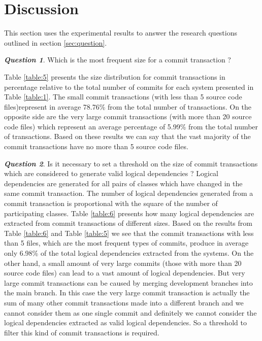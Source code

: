\documentclass[a4paper,twoside]{article}
\begin{document}
\section{Discussion}
\label{sec:discussion}


This section uses the experimental results to answer the research questions outlined in section \ref{sec:question}.


\textit{\textbf{Question 1}}. Which is the most frequent size for a commit transaction ?  

Table \ref{table:5} presents the size distribution for commit transactions in percentage relative to the total number of commits for each system presented in Table \ref{table:1}. The small commit transactions (with less than 5 source code files)represent in average 78.76\% from the total number of transactions. On the opposite side are the very large commit transactions (with more than 20 source code files) which represent an average percentage of 5.99\% from the total number of transactions. Based on these results we can say that the vast majority of the commit transactions have no more than 5 source code files.

\textit{\textbf{Question 2}}. Is it necessary to set a threshold on the size of commit transactions which are considered to generate valid logical dependencies ?
Logical dependencies are generated for all pairs of classes which have changed in the same commit transaction. The number of logical dependencies generated from a commit transaction is proportional with the square of the number of participating classes.  Table \ref{table:6} presents how many logical dependencies are extracted from commit transactions of different sizes. 
Based on the results from Table \ref{table:6} and Table \ref{table:5} we see that the commit transactions with less than 5 files, which are the most frequent types of commits, produce in average only 6.98\% of the total logical dependencies extracted from the systems. On the other hand, a small amount of very large commits (those with more than 20 source code files) can lead to a vast amount of logical dependencies. But very large commit transactions can be caused by merging development branches into the main branch. In this case the very large commit transaction is actually the sum of many other commit transactions made into a different branch and we cannot consider them as one single commit and definitely we cannot consider the logical dependencies extracted as valid logical dependencies. So a threshold to filter this kind of commit transactions is required.
\end{document}
